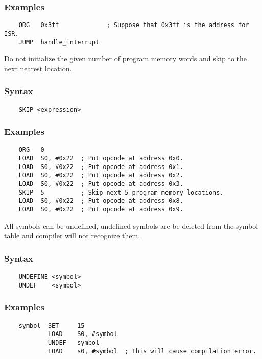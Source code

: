         \subsubsection{Examples}
            \verb'    ORG   0x3ff             ; Suppose that 0x3ff is the address for ISR.'\\
            \verb'    JUMP  handle_interrupt'

    \clearpage
        Do not initialize the given number of program memory words and skip to the next nearest location.

        \subsubsection{Syntax}
            \verb'    SKIP <expression>'

        \subsubsection{Examples}
            \verb'    ORG   0'\\
            \verb'    LOAD  S0, #0x22  ; Put opcode at address 0x0.'\\
            \verb'    LOAD  S0, #0x22  ; Put opcode at address 0x1.'\\
            \verb'    LOAD  S0, #0x22  ; Put opcode at address 0x2.'\\
            \verb'    LOAD  S0, #0x22  ; Put opcode at address 0x3.'\\
            \verb'    SKIP  5          ; Skip next 5 program memory locations.'\\
            \verb'    LOAD  S0, #0x22  ; Put opcode at address 0x8.'\\
            \verb'    LOAD  S0, #0x22  ; Put opcode at address 0x9.'

        All symbols can be undefined, undefined symbols are be deleted from the symbol table and compiler will not recognize them.

        \subsubsection{Syntax}
            \verb'    UNDEFINE <symbol>'\\
            \verb'    UNDEF    <symbol>'

        \subsubsection{Examples}
            \verb'    symbol  SET     15'\\
            \verb'            LOAD    S0, #symbol'\\
            \verb'            UNDEF   symbol'\\
            \verb'            LOAD    s0, #symbol  ; This will cause compilation error.'

